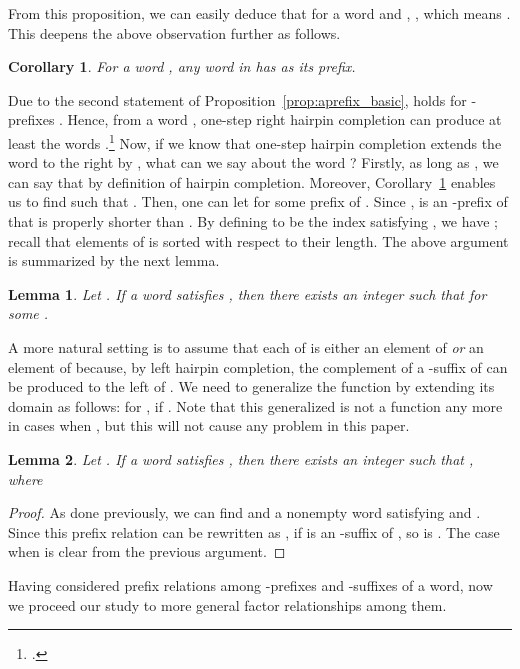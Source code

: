 \documentclass{article}
\theoremstyle{plain}
\newtheorem{lemma}{Lemma}
\newtheorem{corollary}{Corollary}
\theoremstyle{remark}
\begin{document}
From this proposition, we can easily deduce that for a word  and , , which means . 
This deepens the above observation further as follows. 

\begin{corollary}\label{cor:apref_casuff_transitive}
	For a word , any word in  has  as its prefix. 
\end{corollary}

Due to the second statement of Proposition~\ref{prop:aprefix_basic},  holds for -prefixes . 
Hence, from a word , one-step right hairpin completion can produce at least the words .\footnote{.} 
Now, if we know that one-step hairpin completion extends the word to the right by , what can we say about the word ? 
Firstly, as long as , we can say that  by definition of hairpin completion. 
Moreover, Corollary~\ref{cor:apref_casuff_transitive} enables us to find  such that . 
Then, one can let  for some prefix  of . 
Since ,  is an -prefix of  that is properly shorter than . 
By defining  to be the index satisfying , we have ; recall that elements of  is sorted with respect to their length. 
The above argument is summarized by the next lemma. 

\begin{lemma}\label{lem:aprefix_prefix}
	Let . 
	If a word  satisfies , then there exists an integer  such that  for some . 
\end{lemma}

A more natural setting is to assume that each of  is either an element of  {\it or} an element of  because, by left hairpin completion, the complement of a -suffix of  can be produced to the left of . 
We need to generalize the function  by extending its domain as follows: for ,  if . 
Note that this generalized  is not a function any more in cases when , but this will not cause any problem in this paper. 

\begin{lemma}\label{lem:apref_casuf_apref}
	Let . 
	If a word  satisfies , then there exists an integer  such that , where 
	 
\end{lemma}
\begin{proof}
	As done previously, we can find  and a nonempty word  satisfying  and . 
	Since this prefix relation can be rewritten as , if  is an -suffix of , so is . 
	The case when  is clear from the previous argument. 
\end{proof}

Having considered prefix relations among -prefixes and -suffixes of a word, now we proceed our study to more general factor relationships among them. 
\end{document}
